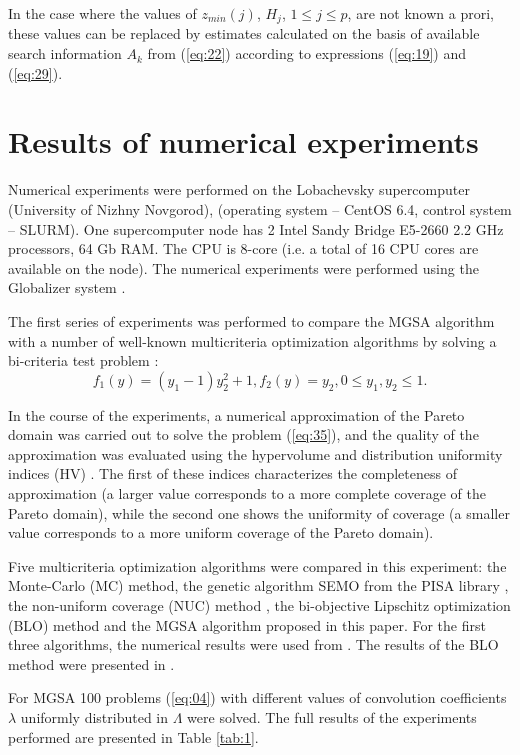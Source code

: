 \documentclass[runningheads]{llncs}
\begin{document}
In the case where the values of $z_{min} (j)$, $H_j$, $1 \leq j \leq p$, are not known a prori, these values can be replaced by estimates calculated on the basis of available search information $A_k$ from (\ref{eq:22}) according to expressions (\ref{eq:19}) and (\ref{eq:29}).


\section{Results of numerical experiments} \label{sec:05}

Numerical experiments were performed on the Lobachevsky supercomputer (University of Nizhny Novgorod), (operating system -- CentOS 6.4, control system -- SLURM). One supercomputer node has 2 Intel Sandy Bridge E5-2660 2.2 GHz processors, 64 Gb RAM. The CPU is 8-core (i.e. a total of 16 CPU cores are available on the node). The numerical experiments were performed using the Globalizer system \cite{c36}.

      The first series of experiments was performed to compare the MGSA algorithm with a number of well-known multicriteria optimization algorithms by solving a bi-criteria test problem \cite{c40}:
\begin{equation}
\label{eq:35}
f_1 (y)=(y_1-1) y_2^2+1,f_2 (y)=y_2, 0 \leq y_1, y_2 \leq 1.
\end{equation}

In the course of the experiments, a numerical approximation of the Pareto domain was carried out to solve the problem (\ref{eq:35}), and the quality of the approximation was evaluated using the hypervolume and distribution uniformity indices (HV) \cite{c37,c40}. The first of these indices characterizes the completeness of approximation (a larger value corresponds to a more complete coverage of the Pareto domain), while the second one shows the uniformity of coverage (a smaller value corresponds to a more uniform coverage of the Pareto domain).

Five multicriteria optimization algorithms were compared in this experiment: the Monte-Carlo (MC) method, the genetic algorithm SEMO from the PISA library \cite{c42}, the non-uniform coverage (NUC) method \cite{c40}, the bi-objective Lipschitz optimization (BLO) method \cite{c39} and the MGSA algorithm proposed in this paper. For the first three algorithms, the numerical results were used from \cite{c41}. The results of the BLO method were presented in \cite{c39}.

For MGSA 100 problems (\ref{eq:04}) with different values of convolution coefficients $\lambda$ uniformly distributed in $\Lambda$ were solved. The full results of the experiments performed are presented in Table \ref{tab:1}.
\end{document}
